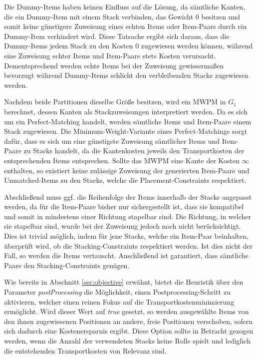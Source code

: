 Die Dummy-Items haben keinen Einfluss auf die Lösung, da sämtliche Kanten, die ein Dummy-Item mit einem Stack verbinden,
das Gewicht $0$ besitzen und somit keine günstigere Zuweisung eines echten Items oder Item-Paars durch ein Dummy-Item
verhindert wird. Diese Tatsache ergibt sich daraus, dass die Dummy-Items jedem Stack zu den Kosten $0$ zugewiesen
werden können, während eine Zuweisung echter Items und Item-Paare stets Kosten verursacht. Dementsprechend werden
echte Items bei der Zuweisung gewissermaßen bevorzugt während Dummy-Items schlicht den verbleibenden Stacks zugewiesen werden.

Nachdem beide Partitionen dieselbe Größe besitzen, wird ein \textsc{MWPM} in $G_1$ berechnet, dessen Kanten als
Stackzuweisungen interpretiert werden. Da es sich um ein Perfect-Matching handelt, werden sämtliche Items und Item-Paare einem Stack zugewiesen. Die Minimum-Weight-Variante eines Perfect-Matchings sorgt dafür, dass es sich um eine günstigste Zuweisung sämtlicher Items und Item-Paare zu Stacks handelt, da die Kantenkosten jeweils den Transportkosten der entsprechenden Items entsprechen. Sollte das \textsc{MWPM} eine Kante der Kosten $\infty$ enthalten, so existiert keine zulässige Zuweisung der generierten Item-Paare und Unmatched-Items zu den Stacks, welche die Placement-Constraints respektiert.

Abschließend muss ggf. die Reihenfolge der Items innerhalb der Stacks angepasst werden, da für die Item-Paare bisher nur sichergestellt ist, dass sie kompatibel und somit in mindestens einer Richtung stapelbar sind. Die Richtung, in welcher sie stapelbar sind, wurde bei der Zuweisung jedoch noch nicht berücksichtigt. Dies ist trivial möglich, indem für jene Stacks, welche ein Item-Paar beinhalten, überprüft wird, ob die Stacking-Constraints respektiert werden. Ist dies nicht der Fall, so werden die Items vertauscht. Anschließend ist garantiert, dass sämtliche Paare den Stacking-Constraints genügen.

Wie bereits in Abschnitt \ref{sec:objective} erwähnt, bietet die Heuristik über den Parameter
\textit{postProcessing} die Möglichkeit, einen Postprocessing-Schritt zu aktivieren, welcher einen reinen Fokus
auf die Transportkostenminimierung ermöglicht. Wird dieser Wert auf \textit{true} gesetzt, so werden
ausgewählte Items von den ihnen zugewiesenen Positionen an andere, freie Positionen verschoben,
sofern sich dadurch eine Kostenersparnis ergibt. Diese Option sollte in Betracht gezogen werden,
wenn die Anzahl der verwendeten Stacks keine Rolle spielt und lediglich die entstehenden Transportkosten
von Relevanz sind.

